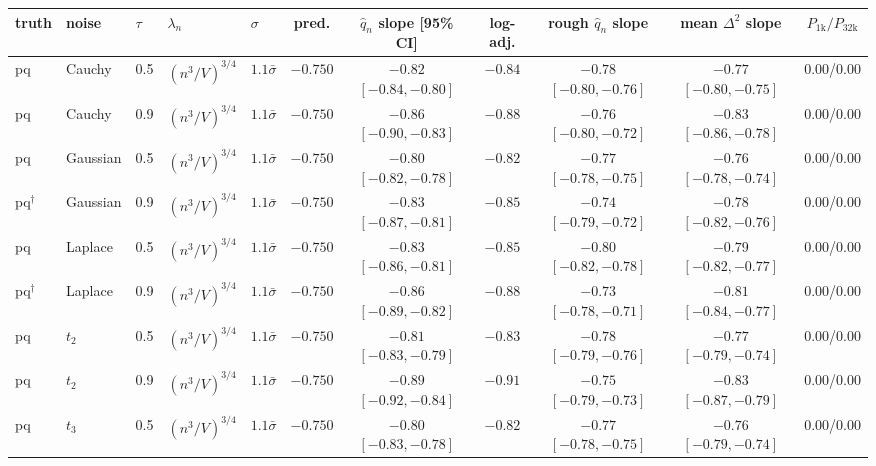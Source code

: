 \begin{longtable}{lllllcccccc}
\toprule
truth & noise & $\tau$ & $\lambda_n$ & $\sigma$ & pred. & $\hat q_n$ slope [95\% CI] & log-adj. & rough $\hat q_n$ slope & mean $\Delta^2$ slope & $P_{1\text{k}}/P_{32\text{k}}$ \\
\midrule
\endhead
pq & Cauchy & 0.5 & $(n^3/V)^{3/4}$ & $1.1\bar\sigma$ & $-0.750$ & $-0.82$ {\scriptsize $[-0.84, -0.80]$} & $-0.84$ & $-0.78$ {\scriptsize $[-0.80, -0.76]$} & $-0.77$ {\scriptsize $[-0.80, -0.75]$} & 0.00/0.00 \\
pq & Cauchy & 0.9 & $(n^3/V)^{3/4}$ & $1.1\bar\sigma$ & $-0.750$ & $-0.86$ {\scriptsize $[-0.90, -0.83]$} & $-0.88$ & $-0.76$ {\scriptsize $[-0.80, -0.72]$} & $-0.83$ {\scriptsize $[-0.86, -0.78]$} & 0.00/0.00 \\
pq & Gaussian & 0.5 & $(n^3/V)^{3/4}$ & $1.1\bar\sigma$ & $-0.750$ & $-0.80$ {\scriptsize $[-0.82, -0.78]$} & $-0.82$ & $-0.77$ {\scriptsize $[-0.78, -0.75]$} & $-0.76$ {\scriptsize $[-0.78, -0.74]$} & 0.00/0.00 \\
pq$^\dagger$ & Gaussian & 0.9 & $(n^3/V)^{3/4}$ & $1.1\bar\sigma$ & $-0.750$ & $-0.83$ {\scriptsize $[-0.87, -0.81]$} & $-0.85$ & $-0.74$ {\scriptsize $[-0.79, -0.72]$} & $-0.78$ {\scriptsize $[-0.82, -0.76]$} & 0.00/0.00 \\
pq & Laplace & 0.5 & $(n^3/V)^{3/4}$ & $1.1\bar\sigma$ & $-0.750$ & $-0.83$ {\scriptsize $[-0.86, -0.81]$} & $-0.85$ & $-0.80$ {\scriptsize $[-0.82, -0.78]$} & $-0.79$ {\scriptsize $[-0.82, -0.77]$} & 0.00/0.00 \\
pq$^\dagger$ & Laplace & 0.9 & $(n^3/V)^{3/4}$ & $1.1\bar\sigma$ & $-0.750$ & $-0.86$ {\scriptsize $[-0.89, -0.82]$} & $-0.88$ & $-0.73$ {\scriptsize $[-0.78, -0.71]$} & $-0.81$ {\scriptsize $[-0.84, -0.77]$} & 0.00/0.00 \\
pq & $t_2$ & 0.5 & $(n^3/V)^{3/4}$ & $1.1\bar\sigma$ & $-0.750$ & $-0.81$ {\scriptsize $[-0.83, -0.79]$} & $-0.83$ & $-0.78$ {\scriptsize $[-0.79, -0.76]$} & $-0.77$ {\scriptsize $[-0.79, -0.74]$} & 0.00/0.00 \\
pq & $t_2$ & 0.9 & $(n^3/V)^{3/4}$ & $1.1\bar\sigma$ & $-0.750$ & $-0.89$ {\scriptsize $[-0.92, -0.84]$} & $-0.91$ & $-0.75$ {\scriptsize $[-0.79, -0.73]$} & $-0.83$ {\scriptsize $[-0.87, -0.79]$} & 0.00/0.00 \\
pq & $t_3$ & 0.5 & $(n^3/V)^{3/4}$ & $1.1\bar\sigma$ & $-0.750$ & $-0.80$ {\scriptsize $[-0.83, -0.78]$} & $-0.82$ & $-0.77$ {\scriptsize $[-0.78, -0.75]$} & $-0.76$ {\scriptsize $[-0.79, -0.74]$} & 0.00/0.00 \\

\end{longtable}
